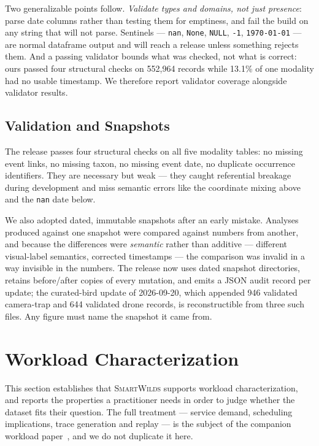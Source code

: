 \documentclass[sigconf]{acmart}
\newcommand{\smartwilds}{\textsc{SmartWilds}\xspace}
\begin{document}
Two generalizable points follow. \emph{Validate types and domains, not
just presence}: parse date columns rather than testing them for
emptiness, and fail the build on any string that will not parse.
Sentinels --- \texttt{nan}, \texttt{None}, \texttt{NULL}, \texttt{-1},
\texttt{1970-01-01} --- are normal dataframe output and will reach a
release unless something rejects them. And a passing validator bounds
what was checked, not what is correct: ours passed four structural checks
on 552{,}964 records while 13.1\% of one modality had no usable
timestamp. We therefore report validator coverage alongside validator
results.

\subsection{Validation and Snapshots}

The release passes four structural checks on all five modality tables:
no missing event links, no missing taxon, no missing event date, no
duplicate occurrence identifiers. They are necessary but weak --- they
caught referential breakage during development and miss semantic errors
like the coordinate mixing above and the \texttt{nan} date below.

We also adopted dated, immutable snapshots after an early mistake.
Analyses produced against one snapshot were compared against numbers
from another, and because the differences were \emph{semantic} rather
than additive --- different visual-label semantics, corrected timestamps
--- the comparison was invalid in a way invisible in the numbers. The
release now uses dated snapshot directories, retains before/after copies
of every mutation, and emits a JSON audit record per update; the
curated-bird update of 2026-09-20, which appended 946 validated
camera-trap and 644 validated drone records, is reconstructible from
three such files. Any figure must name the snapshot it came from.

\section{Workload Characterization}
\label{sec:characterization}

This section establishes that \smartwilds supports workload
characterization, and reports the properties a practitioner needs in
order to judge whether the dataset fits their question. The full
treatment --- service demand, scheduling implications, trace generation
and replay --- is the subject of the companion workload
paper~\cite{smartwilds_workload}, and we do not duplicate it here.
\end{document}
